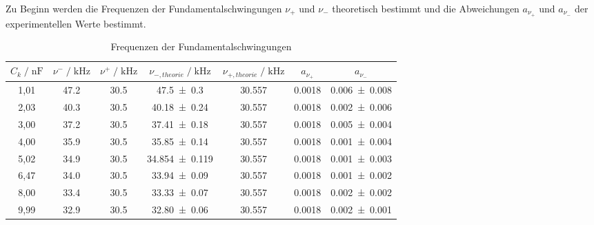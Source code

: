 Zu Beginn werden die Frequenzen der Fundamentalschwingungen $\nu_+$ und $\nu_-$ theoretisch bestimmt und die Abweichungen $a_{\nu_+}$ und $a_{\nu_-}$ der experimentellen Werte bestimmt.
\begin{table}[H]
    \centering
    \begin{tabular}{c c c c c c c}
        \toprule
        $C_k \; / \; \si{\nano \farad}$    &   $\nu^- \; / \; \si{\kilo \hertz}$  &  $\nu^+ \; / \; \si{\kilo \hertz}$ & $\nu_{-,theorie} \; / \; \si{\kilo \hertz} $ & $\nu_{+,theorie} \; / \; \si{\kilo \hertz}$ & $a_{\nu_+}$ & $a_{\nu_-}$\\
        \midrule
        1,01  &  \num{47,2} & \num{30,5} & \num{47,5\pm 0,3 }       & \num{30,557 }    &  \num{0,0018}    & \num{0,006 \pm 0,008}\\
        2,03  &  \num{40,3} & \num{30,5} & \num{40,18\pm 0,24 }     & \num{30,557 }    &  \num{0,0018}    & \num{0,002 \pm 0,006}\\
        3,00  &  \num{37,2} & \num{30,5} & \num{37,41\pm 0,18 }     & \num{30,557 }    &  \num{0,0018}    & \num{0,005 \pm 0,004}\\
        4,00  &  \num{35,9} & \num{30,5} & \num{35,85\pm 0,14 }     & \num{30,557 }    &  \num{0,0018}    & \num{0,001 \pm 0,004}\\
        5,02  &  \num{34,9} & \num{30,5} & \num{34,854\pm 0,119 }   & \num{30,557 }    &  \num{0,0018}    & \num{0,001 \pm 0,003}\\
        6,47  &  \num{34,0} & \num{30,5} & \num{33,94\pm 0,09 }     & \num{30,557 }    &  \num{0,0018}    & \num{0,001 \pm 0,002}\\
        8,00  &  \num{33,4} & \num{30,5} & \num{33,33\pm 0,07 }     & \num{30,557 }    &  \num{0,0018}    & \num{0,002 \pm 0,002}\\
        9,99  &  \num{32,9} & \num{30,5} & \num{32,80\pm 0,06 }     & \num{30,557 }    &  \num{0,0018}    & \num{0,002 \pm 0,001}\\
        \bottomrule
    \end{tabular}
    \caption{Frequenzen der Fundamentalschwingungen}
    \label{tab:Frequenzen}
\end{table}

